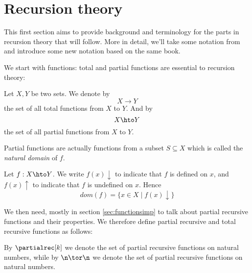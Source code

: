 \section{Recursion theory}
\label{sec:recursionth}
This first section aims to provide background and terminology for the
parts in recursion theory that will follow. More in detail, we'll take
some notation from \cite{cutland1980computability} and introduce some
new notation based on the same book.

We start with functions: total and partial functions are essential to
recursion theory:

\begin{definition}
  Let \(X,Y\) be two sets. We denote by \[X \to Y\] the set of all
  total functions from \(X\) to \(Y\).  And by
  \[X \hto Y\] the set of all partial functions from \(X\) to
  \(Y\).
\end{definition}
\noindent

Partial functions are actually functions from a subset
\(S \subseteq X\) which is called the \emph{natural domain} of \(f\).

\begin{definition}
  Let \(f : X \hto Y\). We write \(f(x)\downarrow\) to indicate that
  \(f\) is defined on \(x\), and \(f(x)\uparrow\) to indicate that
  \(f\) is undefined on \(x\). Hence
  \[dom(f) = \{x \in X \mid f(x)\downarrow\}\]
\end{definition}



We then need, mostly in section \ref{sec:functionsimp} to talk about
partial recursive functions and their properties. We therefore define
partial recursive and total recursive functions as follows:

\begin{notation}\label{bg:partialrec}
  By \(\partialrec[k]\) we denote the set of partial recursive
  functions on natural numbers, while by \(\n \tor \n\) we denote the
  set of partial recursive functions on natural numbers.
\end{notation}

